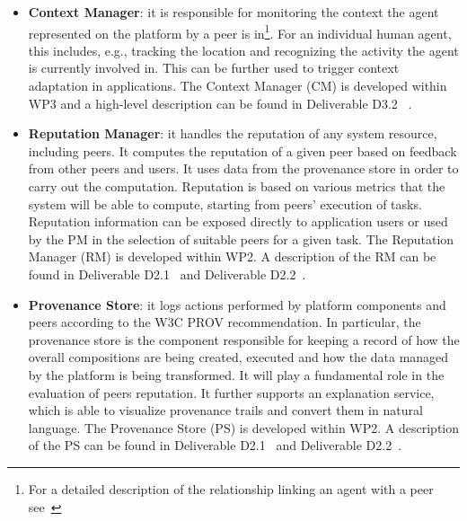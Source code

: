 \begin{itemize}
\item \textbf{Context Manager}: it is responsible for monitoring the context the agent represented on the platform by a peer is in\footnote{For a detailed description of the relationship linking an agent with a peer see~\cite{D2.2}}. For an individual human agent, this includes, e.g., tracking the location and recognizing the activity the agent is currently involved in. This can be further used to trigger context adaptation in applications. The Context Manager (CM) is developed within WP3 and a high-level description can be found in Deliverable D3.2~
\cite{D3.2}.

\item \textbf{Reputation Manager}: it handles the reputation of any system resource, including peers. It computes the reputation of a given peer based on feedback from other peers and users. It uses data from the provenance store in order to carry out the computation. Reputation is based on various metrics that the system will be able to compute, starting from peers' execution of tasks. Reputation information can be exposed directly to application users or used by the PM in the selection of suitable peers for a given task. The Reputation Manager (RM) is developed within WP2. A description of the RM can be found in Deliverable D2.1~\cite{d2.1} and Deliverable D2.2~\cite{D2.2}.


\item \textbf{Provenance Store}: it logs actions performed by platform
components and peers according to the W3C PROV recommendation. In particular, the provenance store is the component responsible for keeping a record of how the overall compositions are being created, executed and how the data managed by the platform is being transformed. It will play a fundamental role in the evaluation of peers reputation. %
It further supports an explanation service, which is able to visualize provenance trails and convert them in natural language. The Provenance Store (PS) is developed within WP2. A description of the PS can be found in Deliverable D2.1~\cite{d2.1} and Deliverable D2.2~\cite{D2.2}.


\end{itemize}
